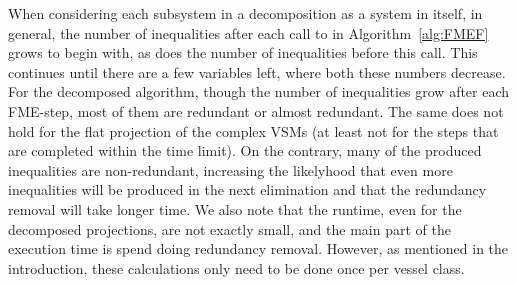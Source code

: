 \documentclass{llncs}
\begin{document}
\indent When considering each subsystem in a decomposition as a system in itself, in general, the number of inequalities after each call to  in Algorithm~\ref{alg:FMEF} grows to begin with, as does the number of inequalities before this call. This continues until there are a few variables left, where both these numbers decrease. For the decomposed algorithm, though the number of inequalities grow after each FME-step, most of them are redundant or almost redundant. The same does not hold for the flat projection of the complex VSMs (at least not for the steps that are completed within the time limit). On the contrary, many of the produced inequalities are non-redundant, increasing the likelyhood that even more inequalities will be produced in the next elimination and that the redundancy removal will take longer time. We also note that the runtime, even for the decomposed projections, are not exactly small, and the main part of the execution time is spend doing redundancy removal. However, as mentioned in the introduction, these calculations only need to be done once per vessel class. 
\end{document}

